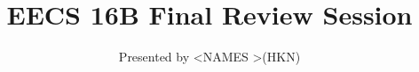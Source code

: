 

\title{EECS 16B Final Review Session}
\author{Presented by \textless NAMES \textgreater (HKN)}
\date{}

\newcommand{\SlideAccessingLogistics}{@\#}















